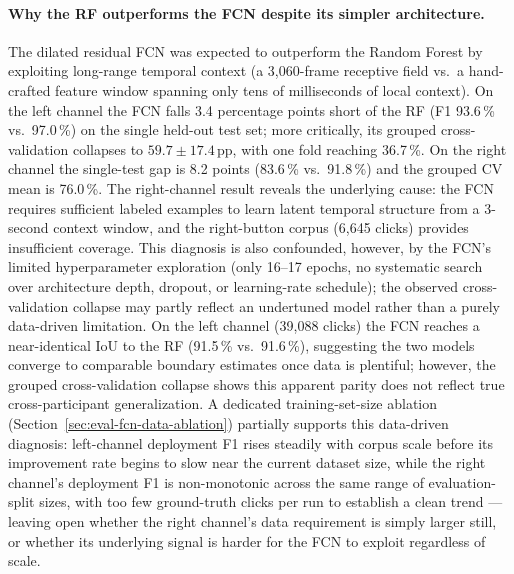 \paragraph{Why the RF outperforms the FCN despite its simpler architecture.}
The dilated residual FCN was expected to outperform the Random Forest by exploiting
long-range temporal context (a 3,060-frame receptive field vs.\ a hand-crafted
feature window spanning only tens of milliseconds of local context).  On the left channel the FCN falls 3.4 percentage points short of the RF
(F1 93.6\,\% vs.\ 97.0\,\%) on the single held-out test set; more critically, its
grouped cross-validation collapses to $59.7 \pm 17.4$\,pp, with one fold reaching
36.7\,\%.  On the right channel the single-test gap is 8.2 points
(83.6\,\% vs.\ 91.8\,\%) and the grouped CV mean is 76.0\,\%.  The right-channel result reveals
the underlying cause: the FCN requires sufficient labeled examples to learn
latent temporal structure from a 3-second context window, and the right-button
corpus (6,645 clicks) provides insufficient coverage.  This diagnosis is also
confounded, however, by the FCN's limited hyperparameter exploration (only
16--17 epochs, no systematic search over architecture depth, dropout, or
learning-rate schedule); the observed cross-validation collapse may partly
reflect an undertuned model rather than a purely data-driven limitation.  On
the left channel
(39,088 clicks) the FCN reaches a near-identical IoU to the RF (91.5\,\% vs.\
91.6\,\%), suggesting the two models converge to comparable boundary estimates
once data is plentiful; however, the grouped cross-validation collapse shows this
apparent parity does not reflect true cross-participant generalization.
A dedicated training-set-size ablation (Section~\ref{sec:eval-fcn-data-ablation})
partially supports this data-driven diagnosis: left-channel deployment F1 rises
steadily with corpus scale before its improvement rate begins to slow near the
current dataset size, while the right channel's deployment F1 is non-monotonic
across the same range of evaluation-split sizes, with too few ground-truth clicks
per run to establish a clean trend --- leaving open whether the right channel's
data requirement is simply larger still, or whether its underlying signal is
harder for the FCN to exploit regardless of scale.

